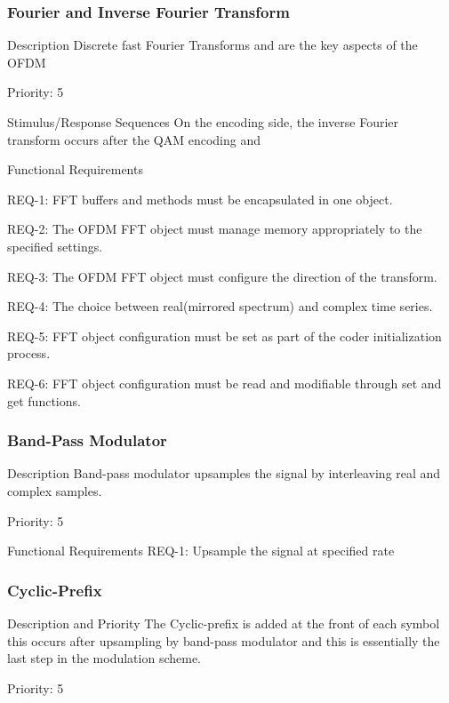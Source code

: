 \documentclass[]{report}
\begin{document}
\subsubsection{Fourier and Inverse Fourier Transform}

Description
Discrete fast Fourier Transforms and are the key aspects of the OFDM 

Priority: 5

Stimulus/Response Sequences
On the encoding side, the inverse Fourier transform occurs after the QAM encoding and 

Functional Requirements

REQ-1: FFT buffers and methods must be encapsulated in one object.  \par
REQ-2: The OFDM FFT object must manage memory appropriately to the specified settings. \par
REQ-3: The OFDM FFT object must configure the direction of the transform.  \par
REQ-4: The choice between real(mirrored spectrum) and complex time series. \par
REQ-5: FFT object configuration must be set as part of the coder initialization process. \par
REQ-6: FFT object configuration must be read and modifiable through set and get functions. \par


\subsubsection{Band-Pass Modulator}

Description
Band-pass modulator upsamples the signal by interleaving real and complex samples.

Priority: 5 

Functional Requirements
REQ-1: Upsample the signal at specified rate 

\subsubsection{Cyclic-Prefix}

Description and Priority
The Cyclic-prefix is added at the front of each symbol this occurs after upsampling by band-pass modulator and this is essentially the last step in the modulation scheme. \par

Priority: 5  \par
 
\end{document}
